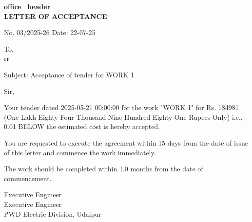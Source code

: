 \documentclass[12pt,a4paper]{article}
\begin{document}
\begin{center}
\textbf{{{office_header}}}\\[0.3cm]
\textbf{LETTER OF ACCEPTANCE}\\[0.2cm]
\end{center}

\vspace{0.5cm}

\noindent
No. 03/2025-26 \hfill Date: 22-07-25

\vspace{0.5cm}

\noindent
To,\\
rr

\vspace{0.3cm}

\noindent
Subject: Acceptance of tender for WORK 1

\vspace{0.3cm}

\noindent
Sir,

\vspace{0.3cm}

\noindent
Your tender dated 2025-05-21 00:00:00 for the work "WORK 1" for Rs. 184981 (One Lakh Eighty Four Thousand Nine Hundred Eighty One Rupees Only) i.e., 0.01 BELOW the estimated cost is hereby accepted.

\vspace{0.3cm}

\noindent
You are requested to execute the agreement within 15 days from the date of issue of this letter and commence the work immediately.

\vspace{0.3cm}

\noindent
The work should be completed within 1.0 months from the date of commencement.

\vspace{1cm}

\noindent
\hfill Executive Engineer\\
\hfill Executive Engineer\\
\hfill PWD Electric Division, Udaipur
\end{document}

